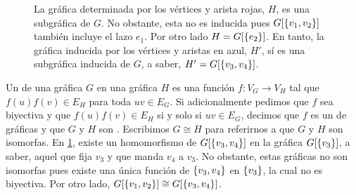 \begin{figure}[ht!]
  \centering
  \captionsetup{font=footnotesize}
  \caption{La gr\'afica determinada por los v\'ertices y arista rojas, $H$, es
   una subgr\'afica de $G$. No obstante, esta no es inducida pues
   $G[\left\{ v_1,v_2\right\}]$ tambi\'en incluye el lazo $e_1$. Por otro lado
   $H=G[\left\{ e_2\right\}]$. En tanto, la gr\'afica inducida por los v\'ertices y aristas
   en azul, $H'$, s\'i es una subgr\'afica inducida de $G$, a saber,
   $H'=G[\left\{ v_3,v_4\right\}]$.}
  \label{fig:grafica-dibujo2}
  \end{figure}

Un  de una gr\'afica $G$ en una gr\'afica $H$ es una
funci\'on $f \colon V_G\to V_H$ tal que $f(u)f(v)\in E_H$ para toda $uv\in E_G$.
Si adicionalmente pedimos que $f$ sea biyectiva y que $f(u)f(v)\in E_H$ si y
solo si $uv\in E_G$, decimos que $f$ es un  de gr\'aficas y
que $G$ y $H$ son . Escribimos $G\cong H$ para
referirnos a que $G$ y $H$ son isomorfas. En \cref{fig:grafica-dibujo2}, existe
un homomorfismo de $G[\left\{ v_3,v_4\right\}]$ en la gr\'afica $G[\left\{ v_3\right\}]$, a saber, aquel
que fija $v_3$ y que manda $v_4$ a $v_3$. No obstante, estas gr\'aficas no son
isomorfas pues existe una \'unica funci\'on de $\left\{ v_3,v_4\right\}$ en $\left\{ v_3\right\}$, la
cual no es biyectiva. Por otro lado, $G[\left\{ v_1,v_2\right\}] \cong G[\left\{ v_3,v_4\right\}]$.

